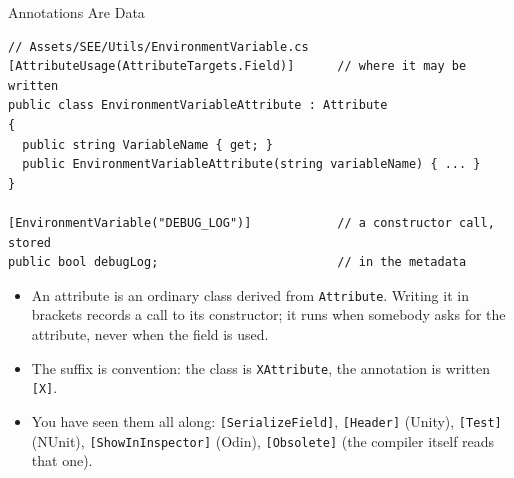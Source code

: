 \begin{frame}[fragile]{Annotations Are Data}
  \begin{lstlisting}[basicstyle=\scriptsize\ttfamily]
// Assets/SEE/Utils/EnvironmentVariable.cs
[AttributeUsage(AttributeTargets.Field)]      // where it may be written
public class EnvironmentVariableAttribute : Attribute
{
  public string VariableName { get; }
  public EnvironmentVariableAttribute(string variableName) { ... }
}

[EnvironmentVariable("DEBUG_LOG")]            // a constructor call, stored
public bool debugLog;                         // in the metadata
  \end{lstlisting}
  \vspace{1ex}

  \begin{itemize}
    \item An attribute is an ordinary class derived from \texttt{Attribute}.
      Writing it in brackets records a call to its constructor; it runs when
      somebody asks for the attribute, never when the field is used.
    \item The suffix is convention: the class is \texttt{XAttribute}, the
      annotation is written \texttt{[X]}.
    \item You have seen them all along: \texttt{[SerializeField]},
      \texttt{[Header]} (Unity), \texttt{[Test]} (NUnit),
      \texttt{[ShowInInspector]} (Odin), \texttt{[Obsolete]} (the compiler
      itself reads that one).
  \end{itemize}
\end{frame}

